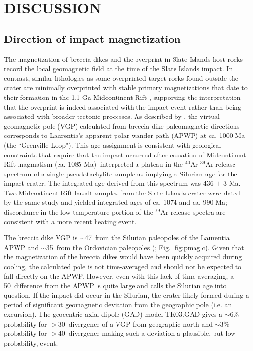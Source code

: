 \documentclass[11pt,letterpaper]{article}
\begin{document}
\section*{DISCUSSION}

\subsection*{Direction of impact magnetization}
The magnetization of breccia dikes and the overprint in Slate Islands host rocks record the local geomagnetic field at the time of the Slate Islands impact. In contrast, similar lithologies as some overprinted target rocks found outside the crater are minimally overprinted with stable primary magnetizations that date to their formation in the 1.1 Ga Midcontinent Rift \citep{Halls1975a, Swanson-Hysell2014b}, supporting the interpretation that the overprint is indeed associated with the impact event rather than being associated with broader tectonic processes.  As described by \cite{Halls1979a}, the virtual geomagnetic pole (VGP) calculated from breccia dike paleomagnetic directions corresponds to Laurentia's apparent polar wander path (APWP) at ca. 1000 Ma (the ``Grenville Loop"). This age assignment is consistent with geological constraints that require that the impact occurred after cessation of Midcontinent Rift magmatism (ca. 1085 Ma). \cite{Dressler1999a} interpreted a plateau in the $^{40}$Ar-$^{39}$Ar release spectrum of a single pseudotachylite sample as implying a Silurian age for the impact crater. The integrated age derived from this spectrum was 436 $\pm$ 3 Ma. Two Midcontinent Rift basalt samples from the Slate Islands crater were dated by the same study and yielded integrated ages of ca. 1074 and ca. 990 Ma; discordance in the low temperature portion of the $^{39}$Ar release spectra are consistent with a more recent heating event.

The breccia dike VGP is $\sim$47\textdegree\ from the Silurian paleopoles of the Laurentia APWP and $\sim$35\textdegree\ from the Ordovician paleopoles (\cite{Torsvik2012a}; Fig. \ref{fig:pmag}c). Given that the magnetization of the breccia dikes would have been quickly acquired during cooling, the calculated pole is not time-averaged and should not be expected to fall directly on the APWP. However, even with this lack of time-averaging, a 50\textdegree\ difference from the APWP is quite large and calls the Silurian age into question. If the impact did occur in the Silurian, the crater likely formed during a period of significant geomagnetic deviation from the geographic pole (i.e. an excursion). The geocentric axial dipole (GAD) model TK03.GAD gives a $\sim$6\% probability for $>$30\textdegree~divergence of a VGP from geographic north and $\sim$3\% probability for $>$40\textdegree~divergence \citep{Tauxe2004a} making such a deviation a plausible, but low probability, event.
\end{document}
